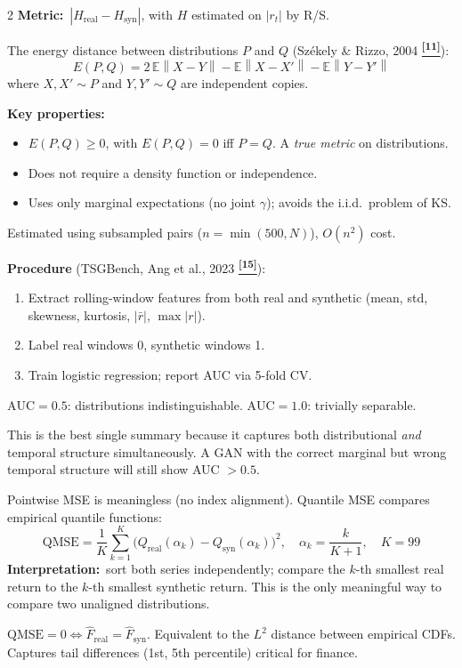\documentclass[10pt]{article}
\newcommand{\skybox}[2]{\begin{tcolorbox}[mybox={Sky}{BBg},title={#1}]#2\end{tcolorbox}}
\newcommand{\tealbox}[2]{\begin{tcolorbox}[mybox={Teal}{LBg},title={#1}]#2\end{tcolorbox}}
\newcommand{\amberbox}[2]{\begin{tcolorbox}[mybox={Amber}{ABg},title={#1}]#2\end{tcolorbox}}
\newcommand{\tcite}[1]{%
  \hyperlink{R:#1}{\textsuperscript{\scriptsize\textbf{[#1]}}}}
\newcommand{\E}{\mathbb{E}}
\newcommand{\norm}[1]{\left\|#1\right\|}
\begin{document}
\begin{multicols}{2}
{\textbf{Metric:}\ $|H_\text{real} - H_\text{syn}|$, with $H$ estimated on $|r_t|$ by R/S.}

\columnbreak

\skybox{3.\ Energy Distance --- A Proper Distributional Metric}{%
The energy distance between distributions $P$ and $Q$ (Sz\'{e}kely \& Rizzo, 2004\tcite{11}):
\begin{equation*}
  E(P,Q) = 2\,\E\norm{X - Y} - \E\norm{X - X'} - \E\norm{Y - Y'}
\end{equation*}
where $X, X' \sim P$ and $Y, Y' \sim Q$ are independent copies.

\textbf{Key properties:}
\begin{itemize}
  \item $E(P,Q) \geq 0$, with $E(P,Q) = 0$ iff $P = Q$. A \emph{true metric} on distributions.
  \item Does not require a density function or independence.
  \item Uses only marginal expectations (no joint $\gamma$); avoids the i.i.d.\ problem of KS.
\end{itemize}
Estimated using subsampled pairs ($n = \min(500, N)$), $O(n^2)$ cost.}

\tealbox{4.\ Discriminative AUC --- The Holistic Score}{%
\textbf{Procedure} (TSGBench, Ang et al., 2023\tcite{15}):
\begin{enumerate}
  \item Extract rolling-window features from both real and synthetic (mean, std, skewness, kurtosis, $|\bar{r}|$, $\max|r|$).
  \item Label real windows 0, synthetic windows 1.
  \item Train logistic regression; report AUC via 5-fold CV.
\end{enumerate}
$\text{AUC} = 0.5$: distributions indistinguishable. $\text{AUC} = 1.0$: trivially separable.

This is the best single summary because it captures both distributional \emph{and} temporal structure simultaneously. A GAN with the correct marginal but wrong temporal structure will still show AUC $> 0.5$.}

\amberbox{5.\ Quantile MSE --- Proper Distribution Shape Comparison}{%
Pointwise MSE is meaningless (no index alignment). Quantile MSE compares empirical quantile functions:
\begin{equation*}
  \text{QMSE} = \frac{1}{K}\sum_{k=1}^K
    \bigl(Q_\text{real}(\alpha_k) - Q_\text{syn}(\alpha_k)\bigr)^2,
  \quad \alpha_k = \frac{k}{K+1},\quad K = 99
\end{equation*}
\textbf{Interpretation:}\ sort both series independently; compare the $k$-th smallest real return to the $k$-th smallest synthetic return. This is the only meaningful way to compare two unaligned distributions.

$\text{QMSE} = 0 \Leftrightarrow \hat{F}_\text{real} = \hat{F}_\text{syn}$. Equivalent to the $L^2$ distance between empirical CDFs. Captures tail differences (1st, 5th percentile) critical for finance.}

\end{multicols}
\end{document}
